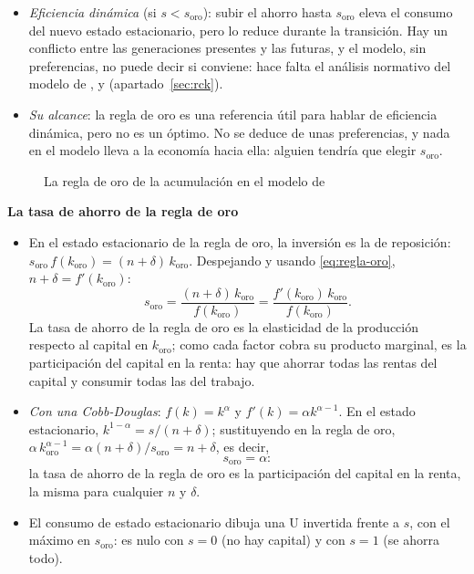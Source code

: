 \documentclass[11pt]{article}
\begin{document}
\begin{itemize}
\item \emph{Eficiencia dinámica} (si $s<s_{\mathrm{oro}}$): subir el ahorro hasta $s_{\mathrm{oro}}$ eleva el consumo del nuevo estado estacionario, pero lo reduce durante la transición. Hay un conflicto entre las generaciones presentes y las futuras, y el modelo, sin preferencias, no puede decir si conviene: hace falta el análisis normativo del modelo de ,  y  (apartado~\ref{sec:rck}).
\item \emph{Su alcance}: la regla de oro es una referencia útil para hablar de eficiencia dinámica, pero no es un óptimo. No se deduce de unas preferencias\nocite{Acemoglu2009}, y nada en el modelo lleva a la economía hacia ella: alguien tendría que elegir $s_{\mathrm{oro}}$.
\end{itemize}

\begin{figure}[H]
\centering
\caption{La regla de oro de la acumulación en el modelo de }\label{fig:solow}
\end{figure}

\begin{anotaciones}
\textbf{La tasa de ahorro de la regla de oro}
\begin{itemize}
\item En el estado estacionario de la regla de oro, la inversión es la de reposición: $s_{\mathrm{oro}}\,f(k_{\mathrm{oro}})=(n+\delta)\,k_{\mathrm{oro}}$. Despejando y usando \eqref{eq:regla-oro}, $n+\delta=f'(k_{\mathrm{oro}})$:
  \[s_{\mathrm{oro}}=\frac{(n+\delta)\,k_{\mathrm{oro}}}{f(k_{\mathrm{oro}})}=\frac{f'(k_{\mathrm{oro}})\,k_{\mathrm{oro}}}{f(k_{\mathrm{oro}})}.\]
  La tasa de ahorro de la regla de oro es la elasticidad de la producción respecto al capital en $k_{\mathrm{oro}}$; como cada factor cobra su producto marginal, es la participación del capital en la renta: hay que ahorrar todas las rentas del capital y consumir todas las del trabajo.
\item \emph{Con una Cobb-Douglas}: $f(k)=k^{\alpha}$ y $f'(k)=\alpha k^{\alpha-1}$. En el estado estacionario, $k^{1-\alpha}=s/(n+\delta)$; sustituyendo en la regla de oro, $\alpha\,k_{\mathrm{oro}}^{\alpha-1}=\alpha(n+\delta)/s_{\mathrm{oro}}=n+\delta$, es decir,
  \[s_{\mathrm{oro}}=\alpha:\]
  la tasa de ahorro de la regla de oro es la participación del capital en la renta, la misma para cualquier $n$ y $\delta$.
\item El consumo de estado estacionario dibuja una U invertida frente a $s$, con el máximo en $s_{\mathrm{oro}}$: es nulo con $s=0$ (no hay capital) y con $s=1$ (se ahorra todo).
\end{itemize}
\begin{figuracaja}
\caption{El consumo de estado estacionario según la tasa de ahorro}\label{fig:consumo-ahorro}
\end{figuracaja}
\end{anotaciones}
\end{document}
